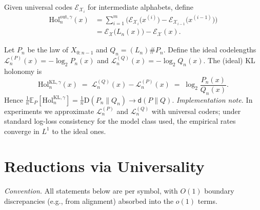 \documentclass[11pt]{article}
\newcommand{\X}{\mathcal{X}}
\newcommand{\E}{\mathbb{E}}
\newcommand{\1}{\mathbbm{1}}
\newcommand{\KL}{\mathrm{D}}
\newcommand{\code}{\mathcal{E}}
\begin{document}
\begin{definition}\label{def:holonomy-out}
Given universal codes $\code_{\X_i}$ for intermediate alphabets, define
\begin{align*}
\mathrm{Hol}_{n}^{\mathrm{out},\gamma}(x)
  &= \sum_{i=1}^m \Big(\code_{\X_i}\big(x^{(i)}\big)-\code_{\X_{i-1}}\big(x^{(i-1)}\big)\Big)\\
  &= \code_{\X}\big(L_n(x)\big)-\code_{\X}(x).
\end{align*}
\end{definition}

\begin{definition}\label{def:holonomy-kl}
Let $P_n$ be the law of $X_{0:n-1}$ and $Q_n=(L_n)\# P_n$. Define the ideal codelengths
$\mathcal{L}^{(P)}_n(x)=-\log_2 P_n(x)$ and $\mathcal{L}^{(Q)}_n(x)=-\log_2 Q_n(x)$.
The (ideal) KL holonomy is
\[
\mathrm{Hol}^{\mathrm{KL},\gamma}_n(x) \;=\; \mathcal{L}^{(Q)}_n(x) - \mathcal{L}^{(P)}_n(x)
\;=\; \log_2 \frac{P_n(x)}{Q_n(x)}.
\]
Hence $\tfrac{1}{n}\E_P[\mathrm{Hol}^{\mathrm{KL},\gamma}_n] = \tfrac{1}{n}\KL(P_n\|Q_n) \to \mathsf{d}(P\|Q)$.
\emph{Implementation note.} In experiments we approximate $\mathcal{L}^{(P)}_n$ and $\mathcal{L}^{(Q)}_n$
with universal coders; under standard log-loss consistency for the model class used, the empirical
rates converge in $L^1$ to the ideal ones.
\end{definition}

\section{Reductions via Universality}

\noindent\emph{Convention.} All statements below are per symbol, with $O(1)$
boundary discrepancies (e.g., from alignment) absorbed into the $o(1)$ terms.
\end{document}
